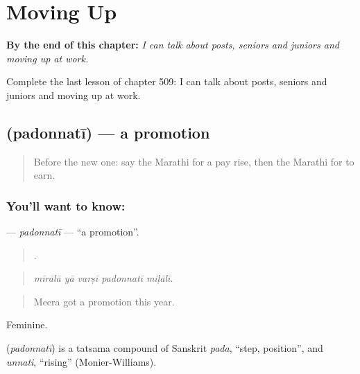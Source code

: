 
\chapter{Moving Up}
\label{ch:mr-moving-up}

\begin{chapteropening}
\textbf{By the end of this chapter:} \emph{I can talk about posts, seniors and juniors and moving up at work.}

Complete the last lesson of chapter 509: I can talk about posts, seniors and juniors and moving up at work.
\end{chapteropening}

\section[\texorpdfstring{\mr{पदोन्नती} (padonnatī)}{पदोन्नती (padonnatī)}]{ (padonnatī) — a promotion}

\label{lesson:MR-C509-padonnati}



\begin{quote}
Before the new one: say the Marathi for a pay rise, then the Marathi for to earn.
\end{quote}

\subsection*{You'll want to know: }
\textbf{} — \emph{padonnatī} — \textquotedblleft{}a promotion\textquotedblright{}.

\begin{quote}
    .
\end{quote}

\begin{quote}
\emph{mīrālā yā varṣī padonnatī miḷālī.}
\end{quote}

\begin{quote}
Meera got a promotion this year.
\end{quote}

Feminine.

\begin{cousinweb}
\textbf{} (\emph{padonnatī}) is a tatsama compound of Sanskrit \emph{pada}, \textquotedblleft{}step, position\textquotedblright{}, and \emph{unnati}, \textquotedblleft{}rising\textquotedblright{} (Monier-Williams).
\end{cousinweb}

